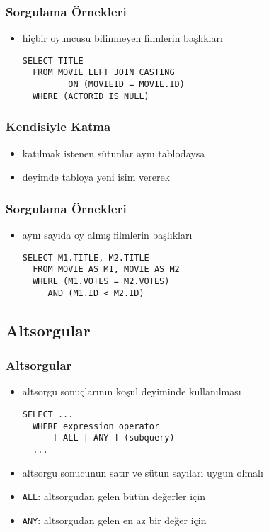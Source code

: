 \documentclass[dvipsnames]{beamer}
\theoremstyle{plain}
\begin{document}
\begin{frame}[fragile]
  \frametitle{Sorgulama Örnekleri}

  \begin{itemize}
    \item hiçbir oyuncusu bilinmeyen filmlerin başlıkları
    \begin{lstlisting}
SELECT TITLE
  FROM MOVIE LEFT JOIN CASTING
         ON (MOVIEID = MOVIE.ID)
  WHERE (ACTORID IS NULL)
    \end{lstlisting}
  \end{itemize}
\end{frame}

\begin{frame}[fragile]
  \frametitle{Kendisiyle Katma}

  \begin{itemize}
    \item katılmak istenen sütunlar aynı tablodaysa
    \item deyimde tabloya yeni isim vererek
  \end{itemize}
\end{frame}

\begin{frame}[fragile]
  \frametitle{Sorgulama Örnekleri}

  \begin{itemize}
    \item aynı sayıda oy almış filmlerin başlıkları
    
    \medskip
    \lstinline!SELECT M1.TITLE, M2.TITLE!\\
    \lstinline!  FROM MOVIE AS M1, MOVIE AS M2!\\
    \lstinline!  WHERE (M1.VOTES = M2.VOTES)!\\
    \pause
    \lstinline!     AND (M1.ID < M2.ID)!
  \end{itemize}
\end{frame}

\subsection{Altsorgular}

\begin{frame}[fragile]
  \frametitle{Altsorgular}

  \begin{itemize}
    \item altsorgu sonuçlarının koşul deyiminde kullanılması
    \begin{lstlisting}
SELECT ...
  WHERE expression operator
      [ ALL | ANY ] (subquery)
  ...
    \end{lstlisting}

    \item altsorgu sonucunun satır ve sütun sayıları uygun olmalı
    \item \lstinline!ALL!: altsorgudan gelen bütün değerler için
    \item \lstinline!ANY!: altsorgudan gelen en az bir değer için
  \end{itemize}
\end{frame}
\end{document}
